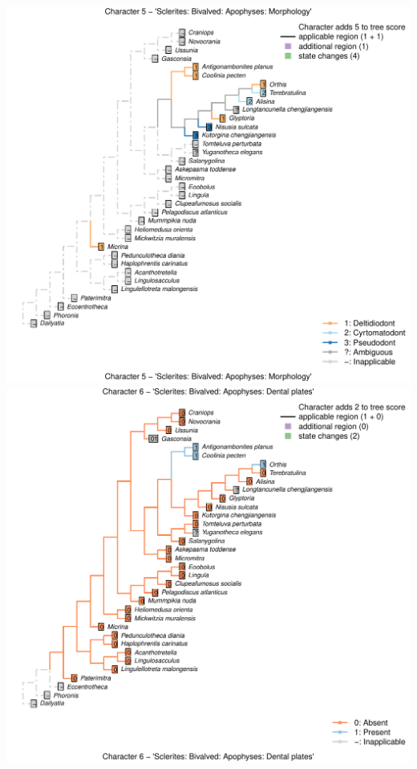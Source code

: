 \documentclass[]{book}
\theoremstyle{definition}
\theoremstyle{definition}
\theoremstyle{definition}
\theoremstyle{remark}
\begin{document}
\includegraphics{Brachiopod_phylogeny_files/figure-latex/unnamed-chunk-4-5.pdf}
\includegraphics{Brachiopod_phylogeny_files/figure-latex/unnamed-chunk-4-6.pdf}
\end{document}
